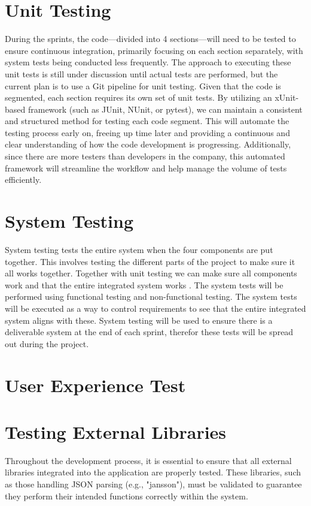 \documentclass{article}
\begin{document}
\section{Unit Testing}

During the sprints, the code—divided into 4 sections—will need to be tested to ensure continuous integration, primarily focusing on each section separately, with system tests being conducted less frequently. The approach to executing these unit tests is still under discussion until actual tests are performed, but the current plan is to use a Git pipeline for unit testing. Given that the code is segmented, each section requires its own set of unit tests. By utilizing an xUnit-based framework (such as JUnit, NUnit, or pytest), we can maintain a consistent and structured method for testing each code segment. This will automate the testing process early on, freeing up time later and providing a continuous and clear understanding of how the code development is progressing. Additionally, since there are more testers than developers in the company, this automated framework will streamline the workflow and help manage the volume of tests efficiently.

\section{System Testing}
System testing tests the entire system when the four components are put together. This involves testing the different parts of the project to make sure it all works together. Together with unit testing we can make sure all components work and that the entire integrated system works . The system tests will be performed using functional testing and non-functional testing. The system tests will be executed as a way to control requirements to see that the entire integrated system aligns with these.  System testing will be used to ensure there is a deliverable system at the end of each sprint, therefor these tests will be spread out during the project.




\section{User Experience Test}

\section{Testing External Libraries}
Throughout the development process, it is essential to ensure that all external libraries integrated into the application are properly tested. These libraries, such as those handling JSON parsing (e.g., "jansson"), must be validated to guarantee they perform their intended functions correctly within the system.\\
\end{document}
